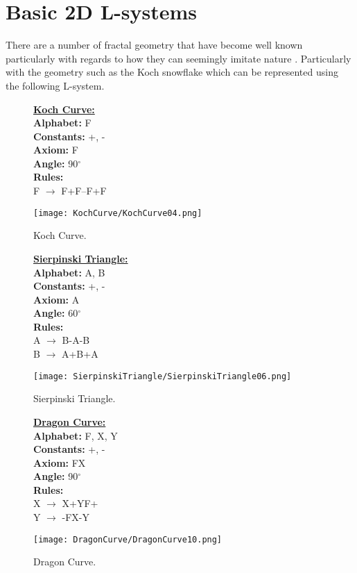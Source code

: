 \section{Basic 2D L-systems} 

There are a number of fractal geometry that have become well known particularly with regards to how they can seemingly imitate nature \cite{mandelbrot1982fractal}. Particularly with the geometry such as the Koch snowflake which can be represented using the following L-system.

\begin{figure}[htbp]
	\raggedright
	\textbf{\underline{Koch Curve:}} \\
	\textbf{Alphabet:} F \\
	\textbf{Constants:} +, - \\
	\textbf{Axiom:} F \\
	\textbf{Angle:} 90$^\circ$ \\
	\textbf{Rules:} \\
	F $\rightarrow$ F+F--F+F\\
	{\centering
		\vspace{7px}
		\texttt{[image: KochCurve/KochCurve04.png]}
		\caption{Koch Curve.}
	}
\end{figure}
\begin{figure}[htbp]
	\raggedright
	\textbf{\underline{Sierpinski Triangle:}} \\
	\textbf{Alphabet:} A, B \\
	\textbf{Constants:} +, - \\
	\textbf{Axiom:} A \\
	\textbf{Angle:} 60$^\circ$ \\
	\textbf{Rules:} \\
	A $\rightarrow$  B-A-B \\
	B $\rightarrow$ A+B+A\\
	{\centering
		\vspace{7px}
		\texttt{[image: SierpinskiTriangle/SierpinskiTriangle06.png]}
		\caption{Sierpinski Triangle.}
	}
\end{figure}
\begin{figure}[htbp]
	\raggedright
	\textbf{\underline{Dragon Curve:}} \\
	\textbf{Alphabet:} F, X, Y \\
	\textbf{Constants:} +, - \\
	\textbf{Axiom:} FX \\
	\textbf{Angle:} 90$^\circ$ \\
	\textbf{Rules:} \\
	X $\rightarrow$ X+YF+ \\
	Y $\rightarrow$ -FX-Y\\
	{\centering
		\vspace{7px}
		\texttt{[image: DragonCurve/DragonCurve10.png]}
		\caption{Dragon Curve.}
	}
\end{figure}

